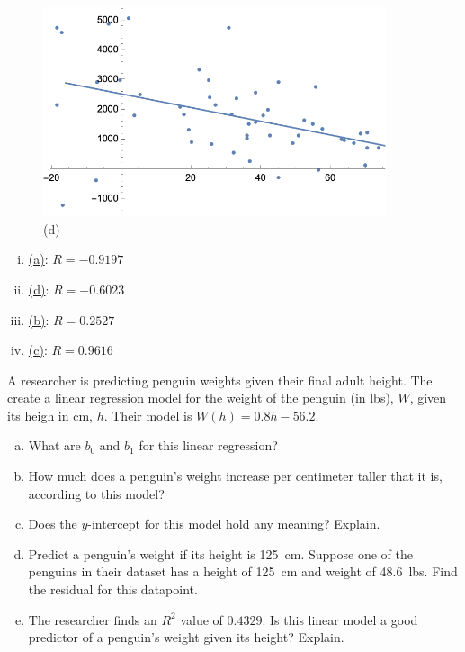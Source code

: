 \documentclass[11pt,letterpaper]{article}
\begin{document}
\begin{figure}[!ht]
\begin{minipage}{0.45\textwidth}
	   \caption*{(c)}
	\end{minipage}
	\begin{minipage}{0.45\textwidth}
	   \centering
	   \includegraphics[width=0.9\textwidth]{reg4.png}
	   \caption*{(d)}
	\end{minipage}
	\end{figure}

\begin{enumerate}[(i)]
\item\underline{\hspace{0.5cm}(a)\hspace{0.5cm}}: $R= -0.9197$
\item\underline{\hspace{0.5cm}(d)\hspace{0.5cm}}: $R= -0.6023$
\item\underline{\hspace{0.5cm}(b)\hspace{0.5cm}}: $R= 0.2527$
\item\underline{\hspace{0.5cm}(c)\hspace{0.5cm}}: $R= 0.9616$
\end{enumerate} 



\newpage



 A researcher is predicting penguin weights given their final adult height. The create a linear regression model for the weight of the penguin (in lbs), $W$, given its heigh in cm, $h$. Their model is $W(h)= 0.8h - 56.2$.
	\begin{enumerate}[(a)]
	\item What are $b_0$ and $b_1$ for this linear regression?
	\item How much does a penguin's weight increase per centimeter taller that it is, according to this model?
	\item Does the $y$-intercept for this model hold any meaning? Explain. 
	\item Predict a penguin's weight if its height is 125~cm. Suppose one of the penguins in their dataset has a height of 125~cm and weight of 48.6~lbs. Find the residual for this datapoint. 
	\item The researcher finds an $R^2$ value of $0.4329$. Is this linear model a good predictor of a penguin's weight given its height? Explain. 
	\end{enumerate} \pspace
\end{document}
